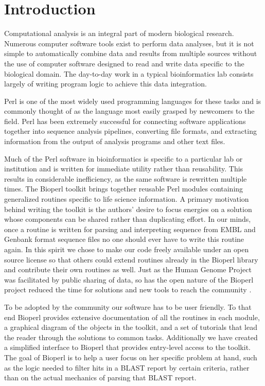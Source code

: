 \documentclass[12pt]{article}
\begin{document}
\section{Introduction}

Computational analysis is an integral part of modern biological
research.  Numerous computer software tools exist to perform data
analyses, but it is not simple to automatically combine data and
results from multiple sources without the use of computer software
designed to read and write data specific to the biological domain.
The day-to-day work in a typical bioinformatics lab consists largely
of writing program logic to achieve this data integration.

Perl is one of the most widely used programming languages for these
tasks and is commonly thought of as the language most easily grasped
by newcomers to the field.  Perl has been extremely successful for
connecting software applications together into sequence analysis
pipelines, converting file formats, and extracting information from
the output of analysis programs and other text files.

Much of the Perl software in bioinformatics is specific to a
particular lab or institution and is written for immediate utility
rather than reusability.  This results in considerable inefficiency,
as the same software is rewritten multiple times.  The Bioperl toolkit
brings together reusable Perl modules containing generalized routines
specific to life science information.  A primary motivation behind
writing the toolkit is the authors' desire to focus energies on a
solution whose components can be shared rather than duplicating
effort.  In our minds, once a routine is written for parsing and
interpreting sequence from EMBL and Genbank format sequence files no
one should ever have to write this routine again.  In this spirit we
chose to make our code freely available under an open source license
\cite{open-source-ref} so that others could extend routines already in
the Bioperl library and contribute their own routines as well.  Just
as the Human Genome Project was facilitated by public sharing of data,
so has the open nature of the Bioperl project reduced the time for
solutions and new tools to reach the community \cite{waterston}.

To be adopted by the community our software has to be user friendly.
To that end Bioperl provides extensive documentation of all the
routines in each module, a graphical diagram of the objects in the
toolkit, and a set of tutorials that lead the reader through the
solutions to common tasks.  Additionally we have created a simplified
interface to Bioperl that provides entry-level access to the toolkit.
The goal of Bioperl is to help a user focus on her specific problem at
hand, such as the logic needed to filter hits in a BLAST \cite{blast}
report by certain criteria, rather than on the actual mechanics of
parsing that BLAST report.
\end{document}

